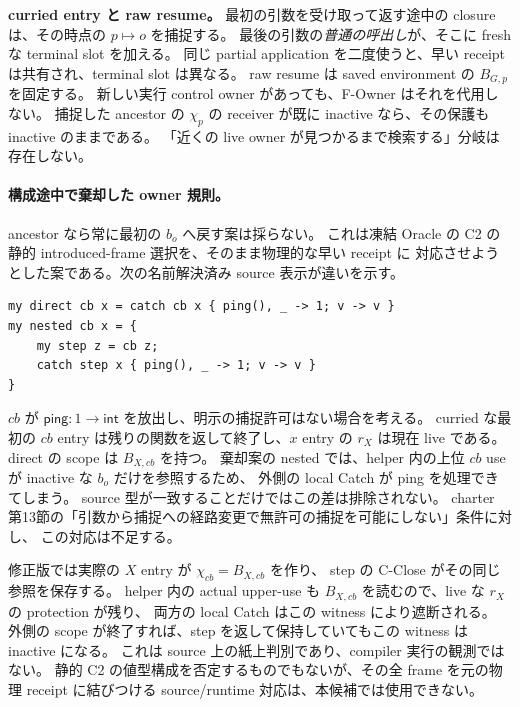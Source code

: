 \documentclass[11pt,a4paper]{article}
\begin{document}
\textbf{curried entry と raw resume。}
最初の引数を受け取って返す途中の closure は、その時点の \(p\mapsto o\) を捕捉する。
最後の引数の\emph{普通の呼出し}が、そこに fresh な terminal slot を加える。
同じ partial application を二度使うと、早い receipt は共有され、terminal slot は異なる。
raw resume は saved environment の \(B_{G,p}\) を固定する。
新しい実行 control owner があっても、F-Owner はそれを代用しない。
捕捉した ancestor の \(\chi_p\) の receiver が既に inactive なら、その保護も inactive のままである。
「近くの live owner が見つかるまで検索する」分岐は存在しない。

\paragraph{構成途中で棄却した owner 規則。}
ancestor なら常に最初の \(b_o\) へ戻す案は採らない。
これは凍結 Oracle の C2 の静的 introduced-frame 選択を、そのまま物理的な早い receipt に
対応させようとした案である。次の名前解決済み source 表示が違いを示す。
\begin{Verbatim}[fontsize=\small]
my direct cb x = catch cb x { ping(), _ -> 1; v -> v }
my nested cb x = {
    my step z = cb z;
    catch step x { ping(), _ -> 1; v -> v }
}
\end{Verbatim}
\(cb\) が \(\mathsf{ping}:1\to\mathsf{int}\) を放出し、明示の捕捉許可はない場合を考える。
curried な最初の \(cb\) entry は残りの関数を返して終了し、\(x\) entry の \(r_X\) は現在 live である。
direct の scope は \(B_{X,cb}\) を持つ。
棄却案の nested では、helper 内の上位 \(cb\) use が inactive な \(b_o\) だけを参照するため、
外側の local Catch が ping を処理できてしまう。
source 型が一致することだけではこの差は排除されない。
charter 第13節の「引数から捕捉への経路変更で無許可の捕捉を可能にしない」条件に対し、
この対応は不足する。

修正版では実際の \(X\) entry が \(\chi_{cb}=B_{X,cb}\) を作り、
step の C-Close がその同じ参照を保存する。
helper 内の actual upper-use も \(B_{X,cb}\) を読むので、live な \(r_X\) の protection が残り、
両方の local Catch はこの witness により遮断される。
外側の scope が終了すれば、step を返して保持していてもこの witness は inactive になる。
これは source 上の紙上判別であり、compiler 実行の観測ではない。
静的 C2 の値型構成を否定するものでもないが、その全 frame を元の物理 receipt に結びつける
source/runtime 対応は、本候補では使用できない。
\end{document}
